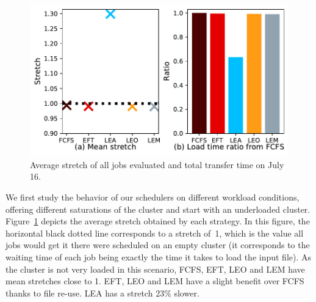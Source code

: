 \documentclass[conference,10pt]{IEEEtran}
\begin{document}
\begin{figure}[t]\centering\includegraphics[width=0.9\linewidth]{../MBSS/plot/Results_FCFS_Score_Backfill_2022-07-16->2022-07-16_V10000_Mean_Stretch_Total_waiting_for_a_load_time_and_transfer_time_450_128_32_256_4_1024.pdf}\caption{Average stretch of all jobs evaluated and total transfer time on July 16.}\label{stretch.07-16}\end{figure}

We first study the behavior of our schedulers on different workload conditions,
offering different saturations of the cluster and start with an
underloaded cluster. 
Figure~\ref{stretch.07-16} depicts the average stretch obtained by each strategy. In this figure, the horizontal black dotted line corresponds to a stretch of~1, which
is the value all jobs would get it there were
scheduled on an empty cluster (it corresponds to the waiting time of each job being exactly
the time it takes to load the input file).
As the cluster is not very loaded in this scenario, FCFS, EFT, LEO and LEM have mean stretches close to 1.
EFT, LEO and LEM have a slight benefit over FCFS thanks to file re-use.
LEA has a stretch 23\% slower.
\end{document}

